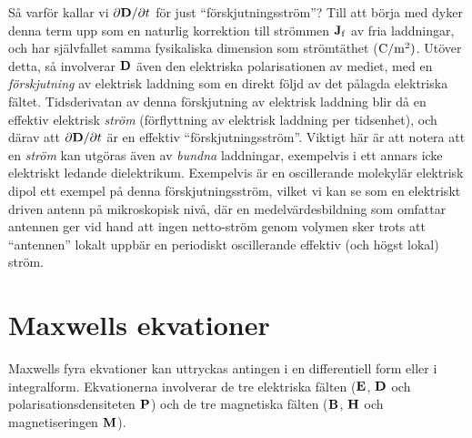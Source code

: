 {{{{{S{\aa} varf{\"o}r kallar vi ${{\partial{\bf D}}/{\partial t}}$ f{\"o}r just
``f{\"o}rskjutningsstr{\"o}m''? Till att b{\"o}rja med dyker denna term upp
som en naturlig korrektion till str{\"o}mmen ${\bf J}_{\rm f}$ av fria
laddningar, och har sj{\"a}lvfallet samma fysikaliska dimension som
str{\"o}mt{\"a}thet (${\rm C}/{\rm m}^2)$. Ut{\"o}ver detta, s{\aa} involverar
${\bf D}$ {\"a}ven den elektriska polarisationen av mediet, med en
{\it f{\"o}rskjutning} av elektrisk laddning som en direkt f{\"o}ljd av det
p{\aa}lagda elektriska f{\"a}ltet. Tidsderivatan av denna f{\"o}rskjutning av
elektrisk laddning blir d{\aa} en effektiv elektrisk {\it str{\"o}m}
(f{\"o}rflyttning av elektrisk laddning per tidsenhet), och d{\"a}rav att
${{\partial{\bf D}}/{\partial t}}$ {\"a}r en effektiv
``f{\"o}rskjutningsstr{\"o}m''. Viktigt h{\"a}r {\"a}r att notera att en
{\it str{\"o}m} kan utg{\"o}ras {\"a}ven av {\it bundna} laddningar,
exempelvis i ett annars icke elektriskt ledande dielektrikum.
\noindent
Exempelvis {\"a}r en oscillerande molekyl{\"a}r elektrisk dipol ett exempel
p{\aa} denna f{\"o}rskjutningsstr{\"o}m, vilket vi kan se som en elektriskt
driven antenn p{\aa} mikroskopisk niv{\aa}, d{\"a}r en medelv{\"a}rdesbildning
som omfattar antennen ger vid hand att ingen netto-str{\"o}m genom volymen sker
trots att ``antennen'' lokalt uppb{\"a}r en periodiskt oscillerande effektiv
(och h{\"o}gst lokal) str{\"o}m.
\vfill\eject

\section{Maxwells ekvationer}
Maxwells fyra ekvationer
kan uttryckas antingen i en differentiell form eller i integralform.
Ekvationerna involverar de tre elektriska f{\"a}lten (${\bf E}$, ${\bf D}$
och polarisationsdensiteten ${\bf P}$) och de tre magnetiska f{\"a}lten
(${\bf B}$, ${\bf H}$ och magnetiseringen ${\bf M}$).

}}}}}
